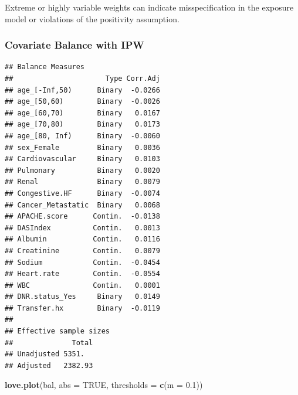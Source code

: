 \documentclass[
]{article}
\newenvironment{Shaded}{\begin{snugshade}}{\end{snugshade}}
\newcommand{\AttributeTok}[1]{\textcolor[rgb]{0.13,0.29,0.53}{#1}}
\newcommand{\CommentTok}[1]{\textcolor[rgb]{0.56,0.35,0.01}{\textit{#1}}}
\newcommand{\ConstantTok}[1]{\textcolor[rgb]{0.56,0.35,0.01}{#1}}
\newcommand{\FloatTok}[1]{\textcolor[rgb]{0.00,0.00,0.81}{#1}}
\newcommand{\FunctionTok}[1]{\textcolor[rgb]{0.13,0.29,0.53}{\textbf{#1}}}
\newcommand{\NormalTok}[1]{#1}
\newcommand{\OtherTok}[1]{\textcolor[rgb]{0.56,0.35,0.01}{#1}}
\newcommand{\SpecialCharTok}[1]{\textcolor[rgb]{0.81,0.36,0.00}{\textbf{#1}}}
\newcommand{\StringTok}[1]{\textcolor[rgb]{0.31,0.60,0.02}{#1}}
\begin{document}
Extreme or highly variable weights can indicate misspecification in the
exposure model or violations of the positivity assumption.

\subsubsection{Covariate Balance with
IPW}\label{covariate-balance-with-ipw}

\begin{Shaded}
\end{Shaded}

\begin{verbatim}
## Balance Measures
##                      Type Corr.Adj
## age_[-Inf,50)      Binary  -0.0266
## age_[50,60)        Binary  -0.0026
## age_[60,70)        Binary   0.0167
## age_[70,80)        Binary   0.0173
## age_[80, Inf)      Binary  -0.0060
## sex_Female         Binary   0.0036
## Cardiovascular     Binary   0.0103
## Pulmonary          Binary   0.0020
## Renal              Binary   0.0079
## Congestive.HF      Binary  -0.0074
## Cancer_Metastatic  Binary   0.0068
## APACHE.score      Contin.  -0.0138
## DASIndex          Contin.   0.0013
## Albumin           Contin.   0.0116
## Creatinine        Contin.   0.0079
## Sodium            Contin.  -0.0454
## Heart.rate        Contin.  -0.0554
## WBC               Contin.   0.0001
## DNR.status_Yes     Binary   0.0149
## Transfer.hx        Binary  -0.0119
## 
## Effective sample sizes
##              Total
## Unadjusted 5351.  
## Adjusted   2382.93
\end{verbatim}

\begin{Shaded}
\begin{Highlighting}[]
\FunctionTok{love.plot}\NormalTok{(bal, }\AttributeTok{abs =} \ConstantTok{TRUE}\NormalTok{, }\AttributeTok{thresholds =} \FunctionTok{c}\NormalTok{(}\AttributeTok{m =} \FloatTok{0.1}\NormalTok{))}
\end{Highlighting}
\end{Shaded}
\end{document}
